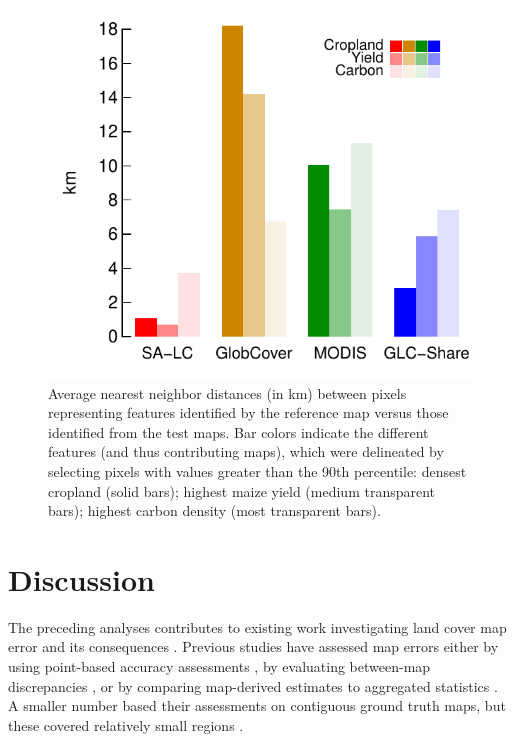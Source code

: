 \documentclass[12 pt, titlepage, a4paper]{article}
\begin{document}

\begin{figure}[!ht]
\centerline{\includegraphics[width=.55\textwidth]{figures/fig7.pdf}}
\caption{Average nearest neighbor distances (in km) between pixels representing features identified by the reference map versus those identified from the test maps. Bar colors indicate the different features (and thus contributing maps), which were delineated by selecting pixels with values greater than the 90th percentile: densest cropland (solid bars); highest maize yield (medium transparent bars); highest carbon density (most transparent bars).}   
\label{afoto}
\end{figure}


\vspace{-0.5 cm}
\section*{Discussion}
\vspace{-0.2 cm}

The preceding analyses contributes to existing work investigating land cover map error and its consequences \citep[e.g.][]{fritz_highlighting_2011,verburg_challenges_2011,olofsson_making_2013}. Previous studies have assessed map errors either by using point-based accuracy assessments \citep[e.g.][]{olofsson_making_2013,frey_how_2007,foody_status_2002}, by evaluating between-map discrepancies \citep[e.g.][]{fritz_highlighting_2011,fritz_identifying_2008,fritz_comparison_2010}, or by comparing map-derived estimates to aggregated statistics \citep[e.g.][]{larsen_taken_2015,fritz_comparison_2010,yu_meta-discoveries_2014}. A smaller number based their assessments on contiguous ground truth maps, but these covered relatively small regions \cite[$<$3000 km$^2$, or $<$0.03\% of the area covered here;][]{dendoncker_exploring_2008,schmit_limitations_2006}.
\end{document}
